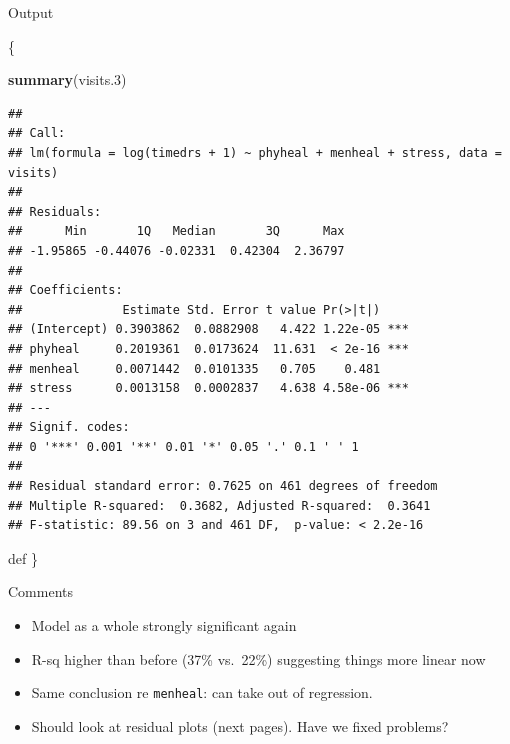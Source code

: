 \documentclass[ignorenonframetext,]{beamer}
\newenvironment{Shaded}{\begin{snugshade}}{\end{snugshade}}
\newcommand{\FloatTok}[1]{\textcolor[rgb]{0.00,0.00,0.81}{#1}}
\newcommand{\KeywordTok}[1]{\textcolor[rgb]{0.13,0.29,0.53}{\textbf{#1}}}
\newcommand{\NormalTok}[1]{#1}
\begin{document}
\begin{frame}[fragile]{Output}
\protect\hypertarget{output-1}{}

\{\scriptsize

\begin{Shaded}
\begin{Highlighting}[]
\KeywordTok{summary}\NormalTok{(visits}\FloatTok{.3}\NormalTok{)}
\end{Highlighting}
\end{Shaded}

\begin{verbatim}
## 
## Call:
## lm(formula = log(timedrs + 1) ~ phyheal + menheal + stress, data = visits)
## 
## Residuals:
##      Min       1Q   Median       3Q      Max 
## -1.95865 -0.44076 -0.02331  0.42304  2.36797 
## 
## Coefficients:
##              Estimate Std. Error t value Pr(>|t|)    
## (Intercept) 0.3903862  0.0882908   4.422 1.22e-05 ***
## phyheal     0.2019361  0.0173624  11.631  < 2e-16 ***
## menheal     0.0071442  0.0101335   0.705    0.481    
## stress      0.0013158  0.0002837   4.638 4.58e-06 ***
## ---
## Signif. codes:  
## 0 '***' 0.001 '**' 0.01 '*' 0.05 '.' 0.1 ' ' 1
## 
## Residual standard error: 0.7625 on 461 degrees of freedom
## Multiple R-squared:  0.3682, Adjusted R-squared:  0.3641 
## F-statistic: 89.56 on 3 and 461 DF,  p-value: < 2.2e-16
\end{verbatim}

def \}

\end{frame}

\begin{frame}[fragile]{Comments}
\protect\hypertarget{comments-4}{}

\begin{itemize}
\item
  Model as a whole strongly significant again
\item
  R-sq higher than before (37\% vs.~22\%) suggesting things more linear
  now
\item
  Same conclusion re \texttt{menheal}: can take out of regression.
\item
  Should look at residual plots (next pages). Have we fixed problems?
\end{itemize}

\end{frame}
\end{document}
